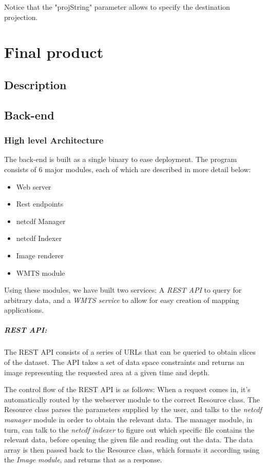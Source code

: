 \documentclass[11pt,a4paper,titlepage,oneside]{report}
\begin{document}
Notice that the "projString" parameter allows to specify the destination projection.

\chapter{Final product}
\section{Description}
\section{Back-end}
\subsection{High level Architecture}
The \gls{back-end} is built as a single binary to ease deployment. The program consists of 6 major modules, each of which are described in more detail below:
\begin{itemize}
	\item Web server
	\item Rest endpoints
	\item \gls{netcdf} Manager
	\item \gls{netcdf} Indexer
	\item Image renderer
	\item \gls{WMTS} module
\end{itemize}  

Using these modules, we have built two services: A \textit{REST \gls{API}} to query for arbitrary data, and a \textit{\gls{WMTS} service} to allow for easy creation of mapping applications.


\paragraph{REST API:}
The REST \gls{API} consists of a series of \gls{URL}s that can be queried to obtain slices of the dataset. The \gls{API} takes a set of data space constraints and returns an image representing the requested area at a given time and depth.

The control flow of the REST \gls{API} is as follows:  
When a request comes in, it's automatically routed by the webserver module to the correct Resource class. The Resource class parses the parameters supplied by the user, and talks to the \textit{\gls{netcdf} manager} module in order to obtain the relevant data.
The manager module, in turn, can talk to the \textit{\gls{netcdf} indexer} to figure out which specific file contains the relevant data, before opening the given file and reading out the data. 
The data array is then passed back to the Resource class, which formats it according using the \textit{Image module}, and returns that as a response.
\end{document}
